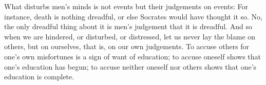 What disturbs  men's minds is  not events but  their judgements on  events: For
instance, death is nothing dreadful, or else Socrates would have thought it so.
No, the only  dreadful thing about it  is men's judgement that  it is dreadful.
And so when we are hindered, or  disturbed, or distressed, let us never lay the
blame on others,  but on ourselves, that  is, on our own  judgements. To accuse
others for  one's own  misfortunes is a  sign of want  of education;  to accuse
oneself shows  that one's education  has begun;  to accuse neither  oneself nor
others shows that one's education is complete.

